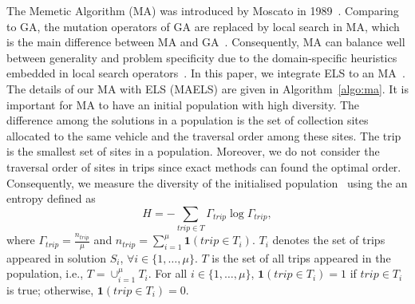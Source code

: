 \documentclass[journal]{IEEEtran}
\begin{document}
The Memetic Algorithm (MA) was introduced by Moscato in 1989~\cite{moscato1989evolution}. Comparing to GA, the mutation operators of GA are replaced by local search in MA, which is the main difference between MA and GA~\cite{tang2009memetic}. Consequently, MA can balance well between generality and problem specificity due to the domain-specific heuristics embedded in local search operators~\cite{tang2009memetic}. In this paper, we integrate ELS to an MA~\cite{moscato1989evolution,tang2009memetic}. The details of our MA with ELS (MAELS) are given in Algorithm~\ref{algo:ma}. 
It is important for MA to have an initial population with high diversity. 
The difference among the solutions in a population is the set of collection sites allocated to the same vehicle and the traversal order among these sites. The trip is the smallest set of sites in a population. Moreover, we do not consider the traversal order of sites in trips since exact methods can found the optimal order. Consequently, we measure the diversity of the initialised population~\cite{maekawa1997genetic} using the an entropy defined as 
\begin{equation}\label{eq:diversity}
H = \mathbf{-}\sum_{trip \in T} \Gamma_{trip} \log{\Gamma_{trip}},
\end{equation} 
where $\Gamma_{trip}=\frac{n_{trip}}{\mu}$ and $n_{trip}=\sum_{i=1}^{\mu} \mathbf{1}(trip \in T_i)$. $T_i$ denotes the set of trips appeared in solution $S_i$, $\forall i \in \{1,\dots, \mu\}$. $T$ is the set of all trips appeared in the population, i.e., $T=\cup_{i=1}^{\mu}T_i$. For all $i \in \{1,\dots, \mu\}$, $\mathbf{1}(trip \in T_i)=1$ if $trip \in T_i$ is true; otherwise, $\mathbf{1}(trip \in T_i)=0$.
\end{document}
